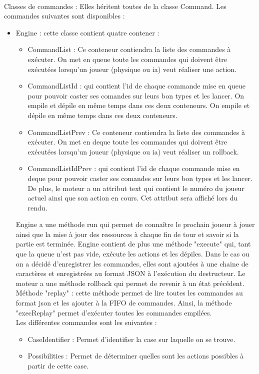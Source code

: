 \documentclass[12pt,a4paper]{article}
\begin{document}
\\Classes de commandes : Elles héritent toutes de la classe Command. Les commandes suivantes sont disponibles :
\begin{itemize}
\item Engine : cette classe contient quatre contener : \begin{itemize}
    \item CommandList : Ce conteneur contiendra la liste des commandes à exécuter. On met en queue toute les commandes qui doivent être exécutées lorsqu'un joueur (physique ou ia) veut réaliser une action.
    \item CommandListId : qui contient l'id de chaque commande mise en queue pour pouvoir caster ses comandes sur leurs bon types et les lancer. On empile et dépile en même temps dans ces deux conteneurs. 
    On empile et dépile en même temps dans ces deux conteneurs. 
    \item CommandListPrev : Ce conteneur contiendra la liste des commandes à exécuter. On met en deque toute les commandes qui doivent être exécutées lorsqu'un joueur (physique ou ia) veut réaliser un rollback.
    \item CommandListIdPrev : qui contient l'id de chaque commande mise en deque pour pouvoir caster ses comandes sur leurs bon types et les lancer. 
De plus, le moteur a un attribut text qui contient le numéro du joueur actuel ainsi que son action en cours. Cet attribut sera affiché lors du rendu.  
\end{itemize}
Engine a une méthode run qui permet de connaître le prochain joueur à jouer ainsi que la mise à jour des ressources à chaque fin de tour et savoir si la partie est terminée.
Engine contient de plus une méthode "execute" qui, tant que la queue n'est pas vide, exécute les actions et les dépiles. Dans le cas ou on a décidé d'enregistrer les commandes, elles sont ajoutées à une chaine de caractères et enregistrées au format JSON à l'exécution du destructeur. Le moteur a une méthode rollback qui permet de revenir à un état précédent. Méthode "replay" : cette méthode permet de lire toutes les commandes au format json et les ajouter à la FIFO de commandes. Ainsi, la méthode "execReplay" permet d'exécuter toutes les commandes empilées. 
\\Les différentes commandes sont les suivantes : 
    \begin{itemize}
        \item CaseIdentifier : Permet d'identifier la case sur laquelle on se trouve.
        \item Possibilities : Permet de déterminer quelles sont les actions possibles à partir de cette case.

\end{itemize}
\end{itemize}
\end{document}
